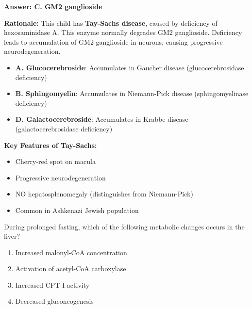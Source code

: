 \begin{solution}
\textbf{Answer: C. GM2 ganglioside}

\textbf{Rationale:} This child has \textbf{Tay-Sachs disease}, caused by deficiency of hexosaminidase A. This enzyme normally degrades GM2 ganglioside. Deficiency leads to accumulation of GM2 ganglioside in neurons, causing progressive neurodegeneration.

\begin{itemize}
    \item \textbf{A. Glucocerebroside}: Accumulates in Gaucher disease (glucocerebrosidase deficiency)
    \item \textbf{B. Sphingomyelin}: Accumulates in Niemann-Pick disease (sphingomyelinase deficiency)
    \item \textbf{D. Galactocerebroside}: Accumulates in Krabbe disease (galactocerebrosidase deficiency)
\end{itemize}

\textbf{Key Features of Tay-Sachs:}
\begin{itemize}
    \item Cherry-red spot on macula
    \item Progressive neurodegeneration
    \item NO hepatosplenomegaly (distinguishes from Niemann-Pick)
    \item Common in Ashkenazi Jewish population
\end{itemize}
\end{solution}

\begin{exercise}
During prolonged fasting, which of the following metabolic changes occurs in the liver?
\begin{enumerate}[label=\Alph*.]
    \item Increased malonyl-CoA concentration
    \item Activation of acetyl-CoA carboxylase
    \item Increased CPT-I activity
    \item Decreased gluconeogenesis
\end{enumerate}
\end{exercise}

